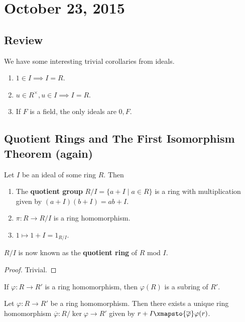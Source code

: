 \section{October 23, 2015}

\subsection{Review}

\begin{rem}
We have some interesting trivial corollaries from ideals.
\begin{enumerate}
\item $1 \in I \implies I = R$.
\item $u \in R^\times, u \in I \implies I = R$.
\item If $F$ is a field, the only ideals are $0, F$.
\end{enumerate}
\end{rem}

\subsection{Quotient Rings and The First Isomorphism Theorem (again)}
\begin{thm}
Let $I$ be an ideal of some ring $R$. Then
\begin{enumerate}
\item The \textbf{quotient group} $R / I = \lbrace a + I \mid a \in R
\rbrace$ is a ring with multiplication given by $(a + I)(b + I) = ab +
I$.
\item $\pi : R \to R / I$ is a ring homomorphism.
\item $1 \mapsto 1 + I = 1_{R / I}$.
\end{enumerate}
$R / I$ is now known as the \textbf{quotient ring} of $R$ mod $I$.
\end{thm}

\begin{proof}
Trivial.
\end{proof}

\begin{prop}
If $\varphi : R \to R'$ is a ring homomorphism, then $\varphi(R)$ is a
subring of $R'$.
\end{prop}

\begin{thm}
Let $\varphi : R \to R'$ be a ring homomorphism. Then there exists a
unique ring homomorphism $\overline{\varphi} : R / \ker \varphi \to R'$
given by $r + I \xmapsto{\overline{\varphi}} \varphi(r)$.
\end{thm}

